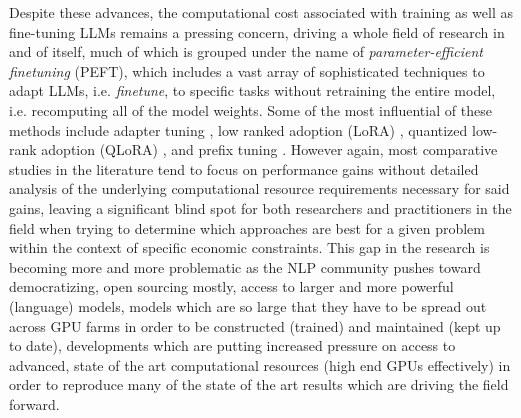 \documentclass[final]{clv2025}
\begin{document}
Despite these advances, the computational cost associated with training as well as fine-tuning LLMs remains a pressing concern, driving a whole field of research in and of itself, much of which is grouped under the name of \textit{parameter-efficient finetuning} (PEFT), which includes a vast array of sophisticated techniques to adapt LLMs, i.e. \textit{finetune}, to specific tasks without retraining the entire model, i.e. recomputing all of the model weights. Some of the most influential of these methods include adapter tuning \cite{pmlr-v97-houlsby19a}, low ranked adoption (LoRA) \cite{hu2021loralowrankadaptationlarge}, quantized low-rank adoption (QLoRA) \cite{dettmers2023qloraefficientfinetuningquantized}, and prefix tuning \cite{li2021prefixtuningoptimizingcontinuousprompts}. However again, most comparative studies in the literature tend to focus on performance gains without detailed analysis of the underlying computational resource requirements necessary for said gains, leaving a significant blind spot for both researchers and practitioners in the field when trying to determine which approaches are best for a given problem within the context of specific economic constraints. This gap in the research is becoming more and more problematic as the NLP community pushes toward democratizing, open sourcing mostly, access to larger and more powerful (language) models, models which are so large that they have to be spread out across GPU farms in order to be constructed (trained) and maintained (kept up to date), developments which are putting increased pressure on access to advanced, state of the art computational resources (high end GPUs effectively) in order to reproduce many of the state of the art results which are driving the field forward.
\end{document}
